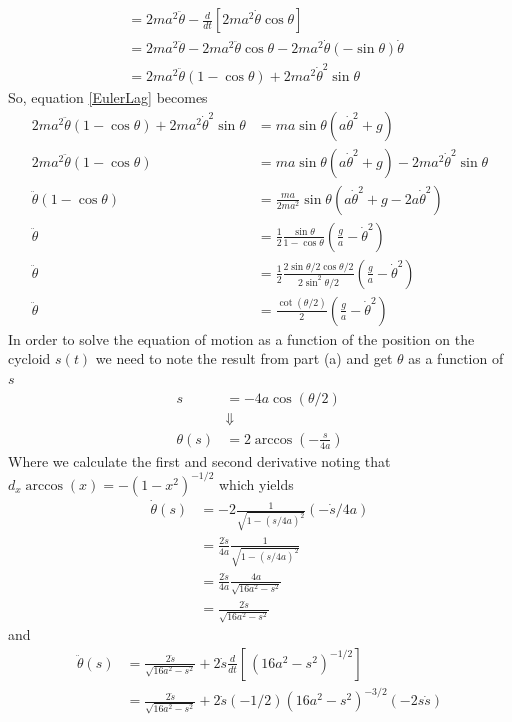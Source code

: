 \documentclass[11pt]{article}
\numberwithin{equation}{section}
\begin{document}
\begin{enumerate}[(a)]
\begin{align*}
&= 2ma^2\ddot{\theta} - \frac{d}{dt}\left[2ma^2\dot{\theta}\cos\theta\right]\\
&= 2ma^2\ddot{\theta} - 2ma^2\ddot{\theta}\cos\theta - 2ma^2\dot{\theta}(-\sin\theta)\dot{\theta}\\
&= 2ma^2\ddot{\theta}(1 - \cos\theta) + 2ma^2\dot{\theta}^2\sin\theta
\end{align*}
So, equation \ref{EulerLag} becomes
\begin{align*}
2ma^2\ddot{\theta}(1 - \cos\theta) + 2ma^2\dot{\theta}^2\sin\theta &= ma\sin\theta(a\dot{\theta}^2+g)\\
2ma^2\ddot{\theta}(1 - \cos\theta) &= ma\sin\theta(a\dot{\theta}^2+g) - 2ma^2\dot{\theta}^2\sin\theta \\
\ddot{\theta}(1 - \cos\theta) &= \frac{ma}{2ma^2}\sin\theta(a\dot{\theta}^2+g-2a\dot{\theta}^2)\\ 
\ddot{\theta} &= \frac{1}{2}\frac{\sin\theta}{1-\cos\theta}\left(\frac{g}{a}-\dot{\theta}^2\right)\\
\ddot{\theta} &= \frac{1}{2}\frac{2\sin\theta/2\cos\theta/2}{2\sin^2\theta/2}\left(\frac{g}{a}-\dot{\theta}^2\right)\\
\ddot{\theta} &= \frac{\cot(\theta/2)}{2}\left(\frac{g}{a}-\dot{\theta}^2\right)
\end{align*}
In order to solve the equation of motion as a function of the position on the cycloid $s(t)$
we need to note the result from part (a) and get $\theta$ as a function of $s$
\begin{align*}
s &= -4a\cos(\theta/2)\\
&\Downarrow\\
\theta(s) &= 2\arccos\left(-\frac{s}{4a}\right)
\end{align*}
Where we calculate the first and second derivative noting that $d_x\arccos(x) = -(1-x^2)^{-1/2}$
which yields
\begin{align*}
\dot{\theta}(s) &= -2\frac{1}{\sqrt{1-(s/4a)^2}}(-\dot{s}/4a)\\
&= \frac{2\dot{s}}{4a}\frac{1}{\sqrt{1-(s/4a)^2}}\\
&= \frac{2\dot{s}}{4a}\frac{4a}{\sqrt{16a^2-s^2}}\\
&= \frac{2\dot{s}}{\sqrt{16a^2-s^2}}
\end{align*}
and
\begin{align*}
\ddot{\theta}(s) &= \frac{2\ddot{s}}{\sqrt{16a^2-s^2}} + 2\dot{s}\frac{d}{dt}\left[\frac{}{}(16a^2-s^2)^{-1/2}\right]\\
&= \frac{2\ddot{s}}{\sqrt{16a^2-s^2}} + 2\dot{s}(-1/2)(16a^2-s^2)^{-3/2}(-2s\dot{s})\\

\end{align*}
\end{enumerate}
\end{document}
